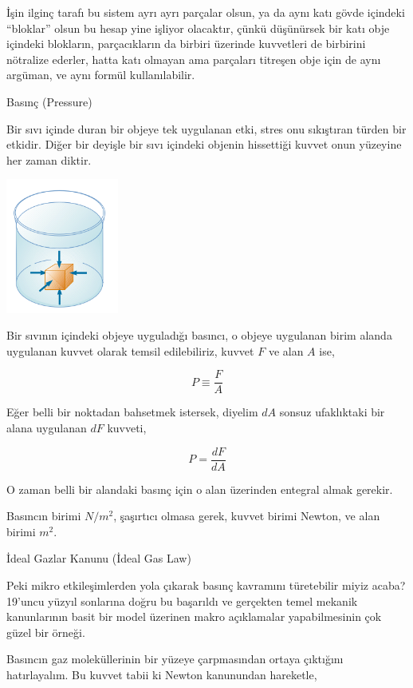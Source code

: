 \documentclass[12pt,fleqn]{article}\usepackage{../../common}
\begin{document}
İşin ilginç tarafı bu sistem ayrı ayrı parçalar olsun, ya da aynı katı gövde
içindeki ``bloklar'' olsun bu hesap yine işliyor olacaktır, çünkü düşünürsek bir
katı obje içindeki blokların, parçacıkların da birbiri üzerinde kuvvetleri de
birbirini nötralize ederler, hatta katı olmayan ama parçaları titreşen obje için
de aynı argüman, ve aynı formül kullanılabilir.










Basınç (Pressure)

Bir sıvı içinde duran bir objeye tek uygulanan etki, stres onu
sıkıştıran türden bir etkidir. Diğer bir deyişle bir sıvı içindeki
objenin hissettiği kuvvet onun yüzeyine her zaman diktir.

\includegraphics[width=10em]{phy_005_basics_07.png}

Bir sıvının içindeki objeye uyguladığı basıncı, o objeye uygulanan
birim alanda uygulanan kuvvet olarak temsil edilebiliriz, kuvvet $F$
ve alan $A$ ise,

$$
P \equiv \frac{F}{A}
$$

Eğer belli bir noktadan bahsetmek istersek, diyelim $dA$ sonsuz
ufaklıktaki bir alana uygulanan $dF$ kuvveti,

$$
P = \frac{dF}{dA}
$$

O zaman belli bir alandaki basınç için o alan üzerinden entegral almak gerekir. 

Basıncın birimi $N / m^2$, şaşırtıcı olmasa gerek, kuvvet birimi
Newton, ve alan birimi $m^2$.

İdeal Gazlar Kanunu (İdeal Gas Law)

Peki mikro etkileşimlerden yola çıkarak basınç kavramını türetebilir miyiz
acaba? 19'uncu yüzyıl sonlarına doğru bu başarıldı ve gerçekten temel mekanik
kanunlarının basit bir model üzerinen makro açıklamalar yapabilmesinin çok güzel
bir örneği.

Basıncın gaz moleküllerinin bir yüzeye çarpmasından ortaya çıktığını
hatırlayalım. Bu kuvvet tabii ki Newton kanunundan hareketle,
\end{document}
